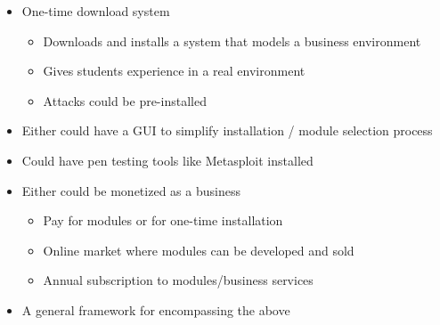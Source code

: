 \documentclass[openright]{report}
\begin{document}
\begin{appendices}
\begin{itemize}
\begin{itemize}
\begin{itemize}
\begin{itemize}
\begin{adjustwidth}{2.5em}{0pt}
\begin{enumerate}
                                    \item Man in the Middle (MITM)
                                    \item SHA-1 / MD5 Collision Attacks
                                    \item Targeting Kerberos Authentication Protocol
                                    \item Buffer overflow for arbitrary code execution
                                \end{enumerate}
                            \end{adjustwidth}
                        \item Modules could be specifically configured virtual machines
                        \item Modules could be specifically configured programs run on host machine
                        \item Modules could have pre-installed HTML to guide students
                    \end{itemize}
                \item One-time download system
                    \begin{itemize}
                        \item Downloads and installs a system that models a business environment
                        \item Gives students experience in a real environment
                        \item Attacks could be pre-installed
                    \end{itemize}
                \item Either could have a GUI to simplify installation / module selection process
                \item Could have pen testing tools like Metasploit installed
                \item Either could be monetized as a business
                    \begin{itemize}
                        \item Pay for modules or for one-time installation 
                        \item Online market where modules can be developed and sold
                        \item Annual subscription to modules/business services 
                    \end{itemize}
                \item A general framework for encompassing the above

\end{itemize}
\end{itemize}
\end{itemize}
\end{appendices}
\end{document}
